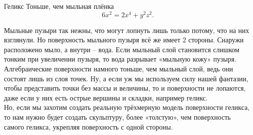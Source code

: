 \begin{surferPage}{Геликс}
Тоньше, чем мыльная плёнка\\
  \smallskip
\[6x^2	= 2x^4	+ y^2	z^2.\]

\singlespacing
Мыльные пузыри так нежны, что могут лопнуть лишь только потому, что на них взглянули. Но поверхность мыльного пузыря всё же имеет $2$ стороны. Снаружи расположено мыло, а внутри – вода. Если мыльный слой становится слишком тонким при увеличении пузыря, то вода разрывает «мыльную кожу» пузыря. \\
\vspace{0,3cm}
Алгебраические поверхности намного тоньше, чем мыльный слой, ведь они состоят лишь из слоя точек. Ну, а если уж мы используем силу нашей фантазии, чтобы представить точки без массы и величины, то и поверхности не лопаются, даже если у них есть острые вершины и складки, например геликс.\\
\vspace{0,3cm}
Но, если мы захотим создать реальную трёхмерную модель поверхности геликса, то нам нужно будет создать скульптуру, более «толстую», чем поверхность самого геликса, укрепляя поверхность с одной стороны.
\end{surferPage}
